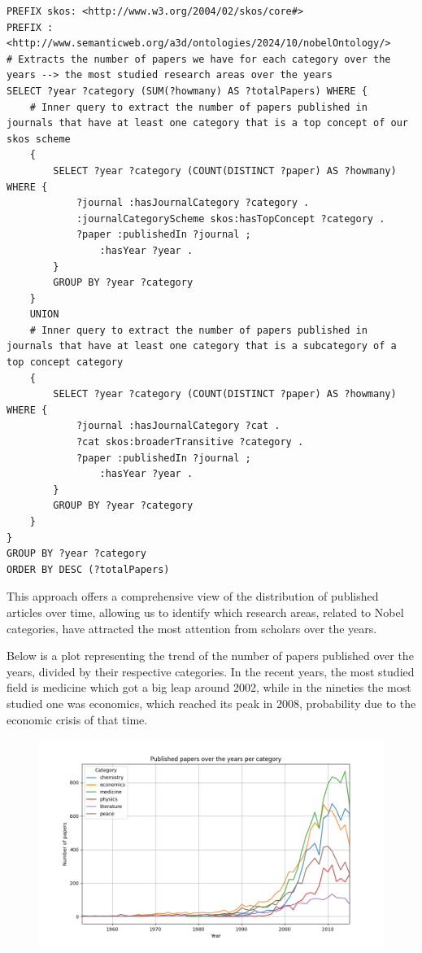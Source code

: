 \documentclass{article}
\begin{document}
\begin{lstlisting}
PREFIX skos: <http://www.w3.org/2004/02/skos/core#>
PREFIX : <http://www.semanticweb.org/a3d/ontologies/2024/10/nobelOntology/>
# Extracts the number of papers we have for each category over the years --> the most studied research areas over the years
SELECT ?year ?category (SUM(?howmany) AS ?totalPapers) WHERE {
    # Inner query to extract the number of papers published in journals that have at least one category that is a top concept of our skos scheme
    {
        SELECT ?year ?category (COUNT(DISTINCT ?paper) AS ?howmany) WHERE {
            ?journal :hasJournalCategory ?category .
            :journalCategoryScheme skos:hasTopConcept ?category .
            ?paper :publishedIn ?journal ;
                :hasYear ?year .
        }
        GROUP BY ?year ?category
    }
    UNION
    # Inner query to extract the number of papers published in journals that have at least one category that is a subcategory of a top concept category
    {
        SELECT ?year ?category (COUNT(DISTINCT ?paper) AS ?howmany) WHERE {
            ?journal :hasJournalCategory ?cat .
            ?cat skos:broaderTransitive ?category .
            ?paper :publishedIn ?journal ;
                :hasYear ?year .
        }
        GROUP BY ?year ?category
    }
}
GROUP BY ?year ?category
ORDER BY DESC (?totalPapers)
\end{lstlisting}

\newpage

\noindent This approach offers a comprehensive view of the distribution of published articles over time, allowing us to identify which research areas, related
to Nobel categories, have attracted the most attention from scholars over the years.

\noindent Below is a plot representing the trend of the number of papers published over the years, divided by their respective categories.
In the recent years, the most studied field is medicine which got a big leap around 2002, while in the nineties the most studied one was economics, which
reached its peak in 2008, probability due to the economic crisis of that time.
\begin{figure}[ht]
	\centering
	\includegraphics[width=\textwidth]{../queries/plots/papersPerCategory.png}
\end{figure}
\end{document}
